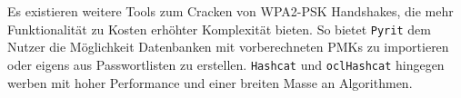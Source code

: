Es existieren weitere Tools zum Cracken von WPA2-PSK Handshakes, die mehr Funktionalität zu Kosten erhöhter Komplexität bieten.
So bietet \texttt{Pyrit} dem Nutzer die Möglichkeit Datenbanken mit vorberechneten PMKs zu importieren oder eigens aus Passwortlisten zu erstellen.
\texttt{Hashcat} und \texttt{oclHashcat} hingegen werben mit hoher Performance und einer breiten Masse an Algorithmen.
